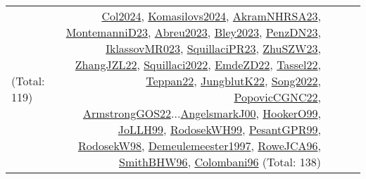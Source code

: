 {\begin{longtable}{p{3cm}r>{\raggedright\arraybackslash}p{6cm}>{\raggedright\arraybackslash}p{6cm}>{\raggedright\arraybackslash}p{8cm}}
(Total: 119) & \hyperref[detail:Col2024]{Col2024}, \hyperref[detail:Komasilovs2024]{Komasilovs2024}, \hyperref[detail:AkramNHRSA23]{AkramNHRSA23}, \hyperref[detail:MontemanniD23]{MontemanniD23}, \hyperref[detail:Abreu2023]{Abreu2023}, \hyperref[detail:Bley2023]{Bley2023}, \hyperref[detail:PenzDN23]{PenzDN23}, \hyperref[detail:IklassovMR023]{IklassovMR023}, \hyperref[detail:SquillaciPR23]{SquillaciPR23}, \hyperref[detail:ZhuSZW23]{ZhuSZW23}, \hyperref[detail:ZhangJZL22]{ZhangJZL22}, \hyperref[detail:Squillaci2022]{Squillaci2022}, \hyperref[detail:EmdeZD22]{EmdeZD22}, \hyperref[detail:Tassel22]{Tassel22}, \hyperref[detail:Teppan22]{Teppan22}, \hyperref[detail:JungblutK22]{JungblutK22}, \hyperref[detail:Song2022]{Song2022}, \hyperref[detail:PopovicCGNC22]{PopovicCGNC22}, \hyperref[detail:ArmstrongGOS22]{ArmstrongGOS22}...\hyperref[detail:AngelsmarkJ00]{AngelsmarkJ00}, \hyperref[detail:HookerO99]{HookerO99}, \hyperref[detail:JoLLH99]{JoLLH99}, \hyperref[detail:RodosekWH99]{RodosekWH99}, \hyperref[detail:PesantGPR99]{PesantGPR99}, \hyperref[detail:RodosekW98]{RodosekW98}, \hyperref[detail:Demeulemeester1997]{Demeulemeester1997}, \hyperref[detail:RoweJCA96]{RoweJCA96}, \hyperref[detail:SmithBHW96]{SmithBHW96}, \hyperref[detail:Colombani96]{Colombani96} (Total: 138)\\

\end{longtable}}
